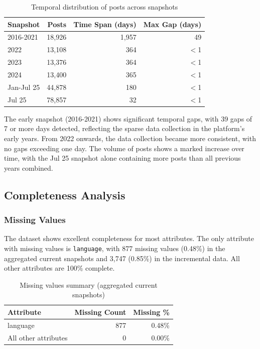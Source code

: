 \begin{table}[H]
	\centering
	\caption{Temporal distribution of posts across snapshots}
	\label{tab:temporaldistribution}
	\begin{tabular}{lrrr}
		\toprule
		\textbf{Snapshot} & \textbf{Posts} & \textbf{Time Span (days)} & \textbf{Max Gap (days)} \\
		\midrule
		2016-2021         & 18,926         & 1,957                     & 49                      \\
		2022              & 13,108         & 364                       & $<$1                    \\
		2023              & 13,376         & 364                       & $<$1                    \\
		2024              & 13,400         & 365                       & $<$1                    \\
		Jan-Jul 25        & 44,878         & 180                       & $<$1                    \\
		Jul 25            & 78,857         & 32                        & $<$1                    \\
		\bottomrule
	\end{tabular}
\end{table}

The early snapshot (2016-2021) shows significant temporal gaps, with 39 gaps of 7 or more days detected, reflecting the sparse data collection in the platform's early years. From 2022 onwards, the data collection became more consistent, with no gaps exceeding one day. The volume of posts shows a marked increase over time, with the Jul 25 snapshot alone containing more posts than all previous years combined.

\subsection*{Completeness Analysis}

\subsubsection{Missing Values}

The dataset shows excellent completeness for most attributes. The only attribute with missing values is \texttt{language}, with 877 missing values (0.48\%) in the aggregated current snapshots and 3,747 (0.85\%) in the incremental data. All other attributes are 100\% complete.

\begin{table}[H]
	\centering
	\caption{Missing values summary (aggregated current snapshots)}
	\label{tab:missing_values}
	\begin{tabular}{lrr}
		\toprule
		\textbf{Attribute}   & \textbf{Missing Count} & \textbf{Missing \%} \\
		\midrule
		language             & 877                    & 0.48\%              \\
		All other attributes & 0                      & 0.00\%              \\
		\bottomrule
	\end{tabular}
\end{table}

